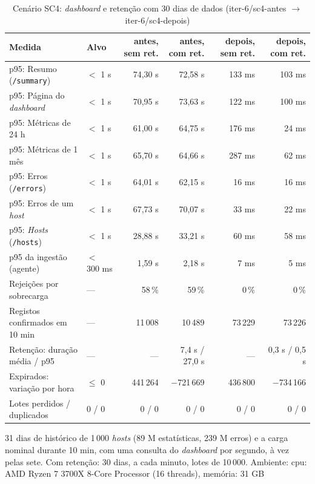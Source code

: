 \begin{table}[htbp]
  \centering\small
  \caption{Cenário SC4: \emph{dashboard} e retenção com 30 dias de dados (iter-6/sc4-antes $\rightarrow$ iter-6/sc4-depois)}
  \label{tab:carga-sc4}
  \begin{tabularx}{\linewidth}{>{\raggedright\arraybackslash}Xlrrrr}
    \toprule
    Medida & Alvo & antes, sem ret. & antes, com ret. & depois, sem ret. & depois, com ret. \\
    \midrule
    p95: Resumo (\texttt{/summary}) & $<$ 1 s & 74,30 s & 72,58 s & 133 ms & 103 ms \\
    p95: Página do \emph{dashboard} & $<$ 1 s & 70,95 s & 73,63 s & 122 ms & 100 ms \\
    p95: Métricas de 24 h & $<$ 1 s & 61,00 s & 64,75 s & 176 ms & 24 ms \\
    p95: Métricas de 1 mês & $<$ 1 s & 65,70 s & 64,66 s & 287 ms & 62 ms \\
    p95: Erros (\texttt{/errors}) & $<$ 1 s & 64,01 s & 62,15 s & 16 ms & 16 ms \\
    p95: Erros de um \emph{host} & $<$ 1 s & 67,73 s & 70,07 s & 33 ms & 22 ms \\
    p95: \emph{Hosts} (\texttt{/hosts}) & $<$ 1 s & 28,88 s & 33,21 s & 60 ms & 58 ms \\
    p95 da ingestão (agente) & $<$ 300 ms & 1,59 s & 2,18 s & 7 ms & 5 ms \\
    Rejeições por sobrecarga & --- & 58\,\% & 59\,\% & 0\,\% & 0\,\% \\
    Registos confirmados em 10 min & --- & 11\,008 & 10\,489 & 73\,229 & 73\,226 \\
    Retenção: duração média / p95 & --- & --- & 7,4 s / 27,0 s & --- & 0,3 s / 0,5 s \\
    Expirados: variação por hora & $\le$ 0 & 441\,264 & $-$721\,669 & 436\,800 & $-$734\,166 \\
    Lotes perdidos / duplicados & 0 / 0 & 0 / 0 & 0 / 0 & 0 / 0 & 0 / 0 \\
    \bottomrule
  \end{tabularx}
  \par\smallskip\footnotesize 31 dias de histórico de 1\,000 \emph{hosts} (89 M estatísticas, 239 M erros) e a carga nominal durante 10 min, com uma consulta do \emph{dashboard} por segundo, à vez pelas sete. Com retenção: 30 dias, a cada minuto, lotes de 10\,000. Ambiente: cpu: AMD Ryzen 7 3700X 8-Core Processor (16 threads), memória: 31 GB
\end{table}
